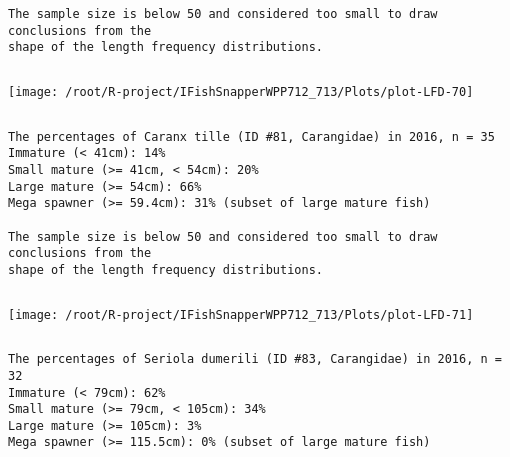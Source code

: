 \documentclass{report}\usepackage[]{graphicx}\usepackage[]{color}
\makeatletter
\def\maxwidth{ %
  \ifdim\Gin@nat@width>\linewidth
    \linewidth
  \else
    \Gin@nat@width
  \fi
}
\newenvironment{kframe}{%
 \def\at@end@of@kframe{}%
 \ifinner\ifhmode%
  \def\at@end@of@kframe{\end{minipage}}%
  \begin{minipage}{\columnwidth}%
 \fi\fi%
 \def\FrameCommand##1{\hskip\@totalleftmargin \hskip-\fboxsep
 \colorbox{shadecolor}{##1}\hskip-\fboxsep
     \hskip-\linewidth \hskip-\@totalleftmargin \hskip\columnwidth}%
 \MakeFramed {\advance\hsize-\width
   \@totalleftmargin\z@ \linewidth\hsize
   \@setminipage}}%
 {\par\unskip\endMakeFramed%
 \at@end@of@kframe}
\newenvironment{knitrout}{}{} %
\makeatother
\begin{document}
\begin{knitrout}
\begin{kframe}
\begin{verbatim}
The sample size is below 50 and considered too small to draw conclusions from the
shape of the length frequency distributions.
\end{verbatim}
\end{kframe}
\newpage
\begin{kframe}\begin{verbatim}
\end{verbatim}
\end{kframe}
\texttt{[image: /root/R-project/IFishSnapperWPP712\_713/Plots/plot-LFD-70]} 
\begin{kframe}\begin{verbatim}
\end{verbatim}
\end{kframe}
\clearpage
\newpage
\begin{kframe}\begin{verbatim}
The percentages of Caranx tille (ID #81, Carangidae) in 2016, n = 35
Immature (< 41cm): 14%
Small mature (>= 41cm, < 54cm): 20%
Large mature (>= 54cm): 66%
Mega spawner (>= 59.4cm): 31% (subset of large mature fish)
 
The sample size is below 50 and considered too small to draw conclusions from the
shape of the length frequency distributions.
\end{verbatim}
\end{kframe}
\newpage
\begin{kframe}\begin{verbatim}
\end{verbatim}
\end{kframe}
\texttt{[image: /root/R-project/IFishSnapperWPP712\_713/Plots/plot-LFD-71]} 
\begin{kframe}\begin{verbatim}
\end{verbatim}
\end{kframe}
\clearpage
\newpage
\begin{kframe}\begin{verbatim}
The percentages of Seriola dumerili (ID #83, Carangidae) in 2016, n = 32
Immature (< 79cm): 62%
Small mature (>= 79cm, < 105cm): 34%
Large mature (>= 105cm): 3%
Mega spawner (>= 115.5cm): 0% (subset of large mature fish)
 

\end{verbatim}
\end{kframe}
\end{knitrout}
\end{document}
